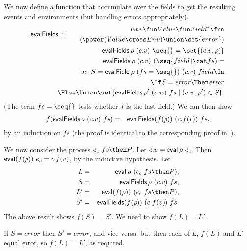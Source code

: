 We now define a function that accumulate over the fields to get the
resulting events and environments (but handling errors appropriately).
\[
\begin{align}
\evalFields :: 
  \begin{align}
  Env \fun  Value \fun Field^* \fun \\
  \qquad (\power (Value \cross Env) \union \set{error})
  \end{align} \\
\evalFields \rho~(c.v)~\seq{} = \set{(c.v,\rho)} \\
\evalFields \rho~(c.v)~(\seq{field} \cat fs)  = \\
\qquad
  \begin{align}
  \Let S = \evalField \rho~(fs=\seq{})~(c.v)~field \In \\
  \If S = \error \Then \error \\
  \Else \Union \set{ \evalFields \rho'~(c.w)~fs \mid  (c.w, \rho') \in S }.
  \end{align}
\end{align}
\]
(The term $fs=\seq{}$ tests whether $f$ is the last field.)
We can then show 
\begin{eqnarray*}%
f(\evalFields \rho~(c.v)~fs) & = & 
  \evalFields (f(\rho))~(c.f(v))~fs ,
\end{eqnarray*}
%
by an induction on $fs$ (the proof is identical to the corresponding proof
in~\cite{symmetry-reduction}).


We now consider the process $e_c~ fs \then P$.  Let $c.v = \mathop{\sf eval} \rho~e_c$.
Then $\mathop{\sf eval} (f(\rho))~e_c = c.f(v)$, by the inductive hypothesis.  Let
%
\begin{eqnarray*}
L & = & \eval \rho~ (e_c~ fs \then P), \\
S & = & \evalFields \rho~(c.v)~fs, \\
L' & = &  \eval (f(\rho))~ (e_c~fs \then P), \\
S' & = & \evalFields (f(\rho))~(c.f(v))~fs.
\end{eqnarray*}%
%
The above result shows $f(S) = S'$.  We need to show $f(L) = L'$.

If $S = error$ then $S' = error$, and vice versa; but then each of $L$, $f(L)$
and $L'$ equal error, so $f(L) = L'$, as required. 

